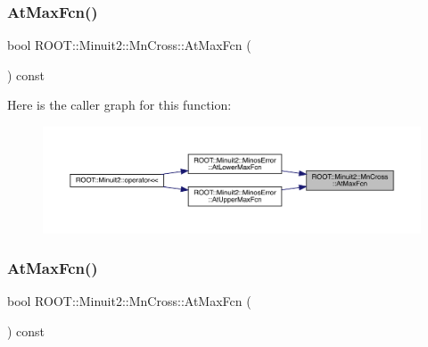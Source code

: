 \mbox{\label{classROOT_1_1Minuit2_1_1MnCross_a785c82249ecae395a16536cfc64aa610}} 
\subsubsection{\texorpdfstring{AtMaxFcn()}{AtMaxFcn()}\hspace{0.1cm}{\footnotesize\ttfamily [1/2]}}
{\footnotesize\ttfamily bool R\+O\+O\+T\+::\+Minuit2\+::\+Mn\+Cross\+::\+At\+Max\+Fcn (\begin{DoxyParamCaption}{ }\end{DoxyParamCaption}) const\hspace{0.3cm}{\ttfamily [inline]}}

Here is the caller graph for this function\+:\nopagebreak
\begin{figure}[H]
\begin{center}
\leavevmode
\includegraphics[width=350pt]{d3/db2/classROOT_1_1Minuit2_1_1MnCross_a785c82249ecae395a16536cfc64aa610_icgraph}
\end{center}
\end{figure}
\mbox{\label{classROOT_1_1Minuit2_1_1MnCross_a785c82249ecae395a16536cfc64aa610}} 
\subsubsection{\texorpdfstring{AtMaxFcn()}{AtMaxFcn()}\hspace{0.1cm}{\footnotesize\ttfamily [2/2]}}
{\footnotesize\ttfamily bool R\+O\+O\+T\+::\+Minuit2\+::\+Mn\+Cross\+::\+At\+Max\+Fcn (\begin{DoxyParamCaption}{ }\end{DoxyParamCaption}) const\hspace{0.3cm}{\ttfamily [inline]}}

